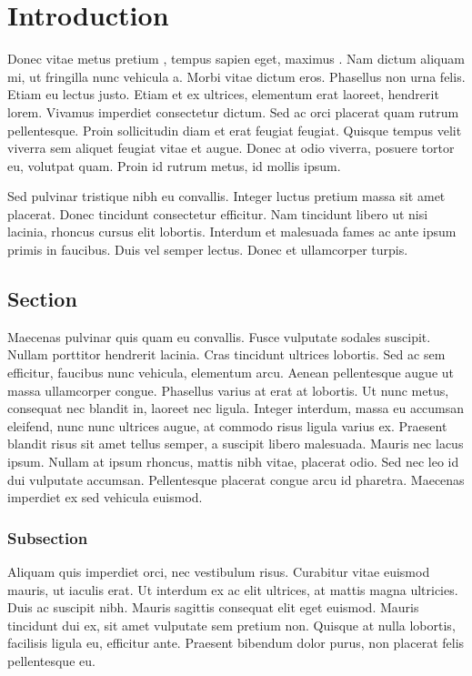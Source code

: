 \chapter{Introduction}

Donec vitae metus pretium \cite{latexcompanion}, tempus sapien eget, maximus \cite{knuthwebsite}. Nam dictum aliquam mi, ut fringilla nunc vehicula a. Morbi vitae dictum eros. Phasellus non urna felis. Etiam eu lectus justo. Etiam et ex ultrices, elementum erat laoreet, hendrerit lorem. Vivamus imperdiet consectetur dictum. Sed ac orci placerat quam rutrum pellentesque. Proin sollicitudin diam et erat feugiat feugiat. Quisque tempus velit viverra sem aliquet feugiat vitae et augue. Donec at odio viverra, posuere tortor eu, volutpat quam. Proin id rutrum metus, id mollis ipsum.

Sed pulvinar tristique nibh eu convallis. Integer luctus pretium massa sit amet placerat. Donec tincidunt consectetur efficitur. Nam tincidunt libero ut nisi lacinia, rhoncus cursus elit lobortis. Interdum et malesuada fames ac ante ipsum primis in faucibus. Duis vel semper lectus. Donec et ullamcorper turpis.

\section{Section}

Maecenas pulvinar quis quam eu convallis. Fusce vulputate sodales suscipit. Nullam porttitor hendrerit lacinia. Cras tincidunt ultrices lobortis. Sed ac sem efficitur, faucibus nunc vehicula, elementum arcu. Aenean pellentesque augue ut massa ullamcorper congue. Phasellus varius at erat at lobortis. Ut nunc metus, consequat nec blandit in, laoreet nec ligula. Integer interdum, massa eu accumsan eleifend, nunc nunc ultrices augue, at commodo risus ligula varius ex. Praesent blandit risus sit amet tellus semper, a suscipit libero malesuada. Mauris nec lacus ipsum. Nullam at ipsum rhoncus, mattis nibh vitae, placerat odio. Sed nec leo id dui vulputate accumsan. Pellentesque placerat congue arcu id pharetra. Maecenas imperdiet ex sed vehicula euismod.

\subsection{Subsection}

Aliquam quis imperdiet orci, nec vestibulum risus. Curabitur vitae euismod mauris, ut iaculis erat. Ut interdum ex ac elit ultrices, at mattis magna ultricies. Duis ac suscipit nibh. Mauris sagittis consequat elit eget euismod. Mauris tincidunt dui ex, sit amet vulputate sem pretium non. Quisque at nulla lobortis, facilisis ligula eu, efficitur ante. Praesent bibendum dolor purus, non placerat felis pellentesque eu.